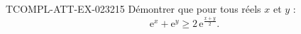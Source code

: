 \begin{exercice}{TCOMPL-ATT-EX-023}{2}{15}
Démontrer que pour tous réels $x$ et $y$ :
\[ \mathrm{e}^x + \mathrm{e}^y \geq 2\,\mathrm{e}^{\frac{x+y}{2}}. \]

\end{exercice}
